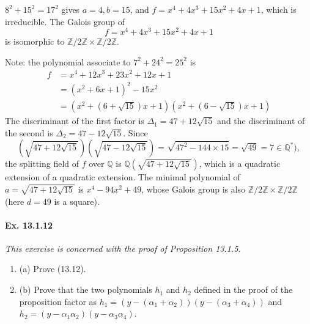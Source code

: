 \documentclass[11pt,a4paper]{article}
\newcommand{\be} {\begin{enumerate}}
\newcommand{\ee} {\end{enumerate}}
\newcommand{\Q}{\mathbb{Q}}
\newcommand{\Z}{\mathbb{Z}}
\begin{document}
$8^2 + 15^2 = 17^2$ gives $a=4, b = 15$, and $f = x^4 + 4 x^3 + 15 x^2 + 4x+1$, which is irreducible.
The Galois group of 
$$f = x^4 + 4 x^3 + 15 x^2 + 4x+1$$
is isomorphic to $\Z/2\Z \times \Z/2\Z$.

Note: the polynomial associate to $7^2 + 24^2 = 25^2$ is 
\begin{align*}
f&= x^4 + 12x^3+23x^2+12x+1\\
&= (x^2+6x+1)^2 - 15x^2\\
&= (x^2+(6+\sqrt{15}) x +1) (x^2 + (6-\sqrt{15}) x +1)
\end{align*}
The discriminant of the first factor is $\Delta_1 = 47 + 12 \sqrt{15}$ and the discriminant of the second is $\Delta_2 = 47 - 12 \sqrt{15}$.
Since
$$\left(\sqrt{47 + 12 \sqrt{15}}\right)\left(\sqrt{47 -  12 \sqrt{15}}\right) = \sqrt{47^2 - 144 \times 15} = \sqrt{49} = 7 \in \Q^*),$$
the splitting field of $f$ over $\Q$ is $\Q\left (\sqrt{47 + 12 \sqrt{15}}\right)$, which is a quadratic extension of a quadratic extension. The minimal polynomial of $a = \sqrt{47 + 12 \sqrt{15}}$ is $x^4-94x^2+49$, whose Galois group is also $\Z/2\Z \times \Z/2\Z$ (here $d=49$ is a square).

\paragraph{Ex. 13.1.12}

{\it This exercise is concerned with the proof of Proposition 13.1.5.
\be
\item[(a)] Prove (13.12).
\item[(b)] Prove that the two polynomials $h_1$ and $h_2$ defined in the proof of the proposition factor as $h_1 = (y-(\alpha_1+\alpha_2))(y-(\alpha_3+\alpha_4))$ and $h_2 = (y - \alpha_1\alpha_2)(y-\alpha_3\alpha_4)$.
\ee
}
\end{document}
